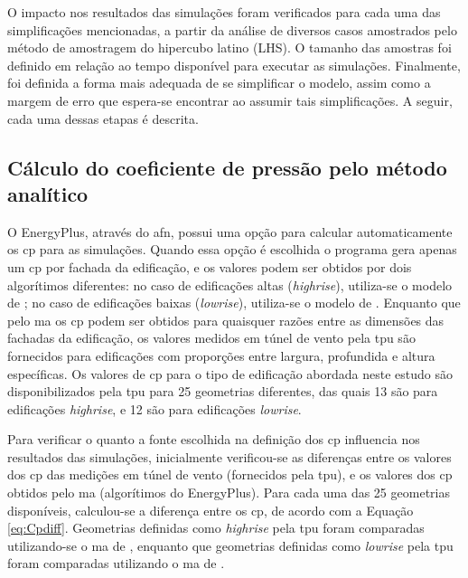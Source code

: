 \documentclass[brazil,hardcopy,openany]{ufscthesis} %
\begin{document}
O impacto nos resultados das simulações foram verificados para cada uma das simplificações mencionadas, a partir da análise de diversos casos amostrados pelo método de amostragem do hipercubo latino (LHS). O tamanho das amostras foi definido em relação ao tempo disponível para executar as simulações.
Finalmente, foi definida a forma mais adequada de se simplificar o modelo, assim como a margem de erro que espera-se encontrar ao assumir tais simplificações.
A seguir, cada uma dessas etapas é descrita.

\subsection*{Cálculo do coeficiente de pressão pelo método analítico}

O EnergyPlus, através do \acrshort{afn}, possui uma opção para calcular automaticamente os \acrshort{cp} para as simulações.
Quando essa opção é escolhida o programa gera apenas um \acrshort{cp} por fachada da edificação, e os valores podem ser obtidos por dois algorítimos diferentes: no caso de edificações altas (\textit{highrise}), utiliza-se o modelo de ; no caso de edificações baixas (\textit{lowrise}), utiliza-se o modelo de .
Enquanto que pelo \acrlong{ma} os \acrshort{cp} podem ser obtidos para quaisquer razões entre as dimensões das fachadas da edificação, os valores medidos em túnel de vento pela \acrshort{tpu} são fornecidos para edificações com proporções entre largura, profundida e altura específicas.
Os valores de \acrshort{cp} para o tipo de edificação abordada neste estudo são disponibilizados pela \acrshort{tpu} para 25 geometrias diferentes, das quais 13 são para edificações \textit{highrise}, e 12 são para edificações \textit{lowrise}.

Para verificar o quanto a fonte escolhida na definição dos \acrshort{cp} influencia nos resultados das simulações, inicialmente verificou-se as diferenças entre os valores dos \acrshort{cp} das medições em túnel de vento (fornecidos pela \acrshort{tpu}), e os valores dos \acrshort{cp} obtidos pelo \acrlong{ma} (algorítimos do EnergyPlus). Para cada uma das 25 geometrias disponíveis, calculou-se a diferença entre os \acrshort{cp}, de acordo com a Equação \ref{eq:Cpdiff}. 
Geometrias definidas como \textit{highrise} pela \acrshort{tpu} foram comparadas utilizando-se o \acrlong{ma} de , enquanto que geometrias definidas como \textit{lowrise} pela \acrshort{tpu} foram comparadas utilizando o \acrlong{ma} de .
\end{document}
